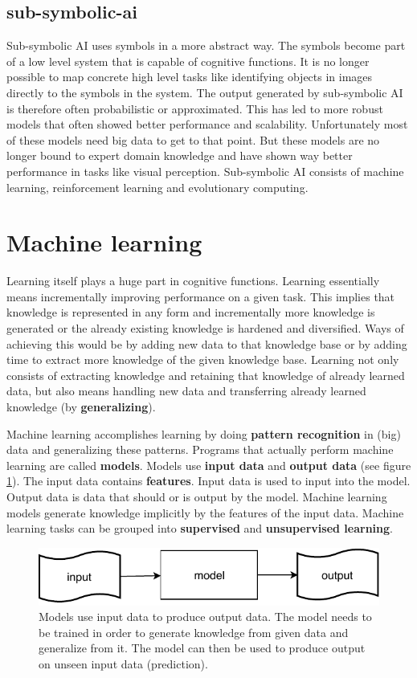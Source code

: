 \documentclass[jou,apacite]{apa6}
\begin{document}
\subsection{\gls{sub-symbolic-ai}}
Sub-symbolic AI uses symbols in a more abstract way. The symbols become part of a low level system that is capable of cognitive functions. It is no longer possible to map concrete high level tasks like identifying objects in images directly to the symbols in the system. The output generated by sub-symbolic AI is therefore often probabilistic or approximated. This has led to more robust models that often showed better performance and scalability. Unfortunately most of these models need big data to get to that point. But these models are no longer bound to expert domain knowledge and have shown way better performance in tasks like visual perception. Sub-symbolic AI consists of machine learning, reinforcement learning and evolutionary computing.

\section{Machine learning}
Learning itself plays a huge part in cognitive functions. Learning essentially means incrementally improving performance on a given task. This implies that knowledge is represented in any form and incrementally more knowledge is generated or the already existing knowledge is hardened and diversified. Ways of achieving this would be by adding new data to that knowledge base or by adding time to extract more knowledge of the given knowledge base. Learning not only consists of extracting knowledge and retaining that knowledge of already learned data, but also means handling new data and transferring already learned knowledge (by \textbf{generalizing}).

Machine learning accomplishes learning by doing \textbf{pattern recognition} in (big) data and generalizing these patterns. 
Programs that actually perform machine learning are called \textbf{models}. Models use \textbf{input data} and \textbf{output data} (see figure \ref{fig:machine-learning-basic}). The input data contains \textbf{features}. Input data is used to input into the model. Output data is data that should or is output by the model. Machine learning models generate knowledge implicitly by the features of the input data. Machine learning tasks can be grouped into \textbf{supervised} and \textbf{unsupervised learning}.

\begin{figure}[!htb]
\centering
	\includegraphics[width=.4\textwidth]{machine-learning-basic.pdf}
\caption[Basic structure of machine learning]{Models use input data to produce output data. The model needs to be trained in order to generate knowledge from given data and generalize from it. The model can then be used to produce output on unseen input data (prediction).}
\label{fig:machine-learning-basic}
\end{figure}
\end{document}

